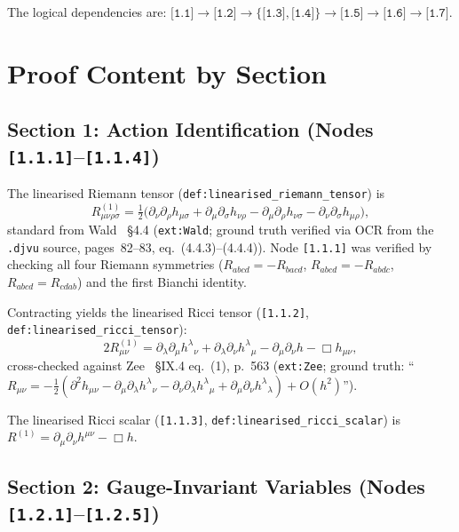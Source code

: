 \documentclass[11pt,a4paper]{article}
\newcommand{\p}{\partial}
\newcommand{\dbox}{\Box}
\newcommand{\afnode}[1]{\texttt{[#1]}}
\newcommand{\afdef}[1]{\texttt{def:#1}}
\newcommand{\afext}[1]{\texttt{ext:#1}}
\begin{document}
The logical dependencies are:
$\afnode{1.1} \to \afnode{1.2} \to \{\afnode{1.3}, \afnode{1.4}\} \to \afnode{1.5} \to \afnode{1.6} \to \afnode{1.7}$.

\section{Proof Content by Section}
\label{sec:content}

\subsection{Section 1: Action Identification (Nodes \afnode{1.1.1}--\afnode{1.1.4})}

The linearised Riemann tensor (\afdef{linearised\_riemann\_tensor}) is
\begin{equation}
R^{(1)}_{\mu\nu\rho\sigma} = \tfrac{1}{2}\bigl(
\p_\nu\p_\rho h_{\mu\sigma} + \p_\mu\p_\sigma h_{\nu\rho}
- \p_\mu\p_\rho h_{\nu\sigma} - \p_\nu\p_\sigma h_{\mu\rho}\bigr),
\label{eq:riemann}
\end{equation}
standard from Wald~\cite{Wald84} \S4.4 (\afext{Wald}; ground truth verified
via OCR from the \texttt{.djvu} source, pages~82--83, eq.~(4.4.3)--(4.4.4)).
Node \afnode{1.1.1} was verified by checking all four Riemann symmetries
($R_{abcd} = -R_{bacd}$, $R_{abcd} = -R_{abdc}$, $R_{abcd} = R_{cdab}$)
and the first Bianchi identity.

Contracting yields the linearised Ricci tensor (\afnode{1.1.2}, \afdef{linearised\_ricci\_tensor}):
\begin{equation}
2R^{(1)}_{\mu\nu} = \p_\lambda\p_\mu h^\lambda{}_\nu + \p_\lambda\p_\nu h^\lambda{}_\mu
- \p_\mu\p_\nu h - \dbox h_{\mu\nu},
\label{eq:ricci}
\end{equation}
cross-checked against Zee~\cite{Zee13} \S IX.4 eq.~(1), p.~563
(\afext{Zee}; ground truth: ``$R_{\mu\nu} = -\tfrac{1}{2}(\p^2 h_{\mu\nu}
- \p_\mu\p_\lambda h^\lambda{}_\nu - \p_\nu\p_\lambda h^\lambda{}_\mu
+ \p_\mu\p_\nu h^\lambda{}_\lambda) + O(h^2)$'').

The linearised Ricci scalar (\afnode{1.1.3}, \afdef{linearised\_ricci\_scalar}) is
$R^{(1)} = \p_\mu\p_\nu h^{\mu\nu} - \dbox h$.

\subsection{Section 2: Gauge-Invariant Variables (Nodes \afnode{1.2.1}--\afnode{1.2.5})}
\end{document}
